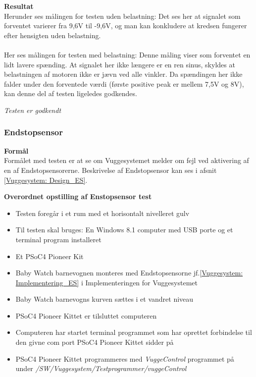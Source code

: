 \textbf{Resultat} \\
Herunder ses målingen for testen uden belastning:
Det ses her at signalet som forventet varierer fra 9,6V til -9,6V, og man kan konkludere at kredsen fungerer efter hensigten uden belastning.\\
\\
Her ses målingen for testen med belastning:
Denne måling viser som forventet en lidt lavere spænding. At signalet her ikke længere er en ren sinus, skyldes at belastningen af motoren ikke er jævn ved alle vinkler. Da spændingen her ikke falder under den forventede værdi (første positive peak er mellem 7,5V og 8V), kan denne del af testen ligeledes godkendes.

\textit{Testen er godkendt}

\subsubsection{Endstopsensor}
\textbf{Formål} \\
Formålet med testen er at se om Vuggesystemet melder om fejl ved aktivering af en af Endstopsensorerne. Beskrivelse af Endstopsensor kan ses i afsnit \vref{Vuggesystem: Design_ES}.

\textbf{Overordnet opstilling af Enstopsensor test}

\begin{itemize}
	\item Testen foregår i et rum med et horisontalt nivelleret gulv
	\item Til testen skal bruges: En Windows 8.1 computer \citep{website:Windows_8_1} med USB porte og et terminal program installeret 
	\item Et PSoC4 Pioneer Kit \citep{website:Cypress}
	\item Baby Watch barnevognen monteres med Endstopsensorne jf.\vref{Vuggesystem: Implementering_ES} i Implementeringen for Vuggesystemet 
	\item Baby Watch barnevogns kurven sættes i et vandret niveau
	\item PSoC4 Pioneer Kittet er tilsluttet computeren
	\item Computeren har startet terminal programmet som har oprettet forbindelse til den givne com port PSoC4 Pioneer Kittet sidder på
	\item PSoC4 Pioneer Kittet programmeres med \textit{VuggeControl} programmet på \citep{cd} under 
	\textit{/SW/Vuggesystem/Testprogrammer/vuggeControl}   
\end{itemize}


